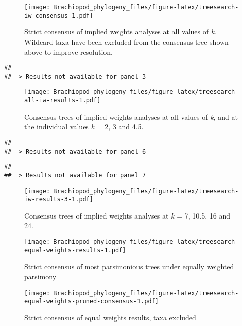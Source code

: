 \documentclass[openany]{book}
\theoremstyle{definition}
\theoremstyle{definition}
\theoremstyle{definition}
\theoremstyle{remark}
\begin{document}
\begin{figure}
\centering
\texttt{[image: Brachiopod\_phylogeny\_files/figure-latex/treesearch-iw-consensus-1.pdf]}
\caption{\label{fig:treesearch-iw-consensus}Strict consensus of implied weights analyses at all
values of \emph{k}. Wildcard taxa have been excluded from the consensus
tree shown above to improve resolution.}
\end{figure}








\clearpage 

\begin{verbatim}
## 
##  > Results not available for panel 3
\end{verbatim}

\begin{figure}
\centering
\texttt{[image: Brachiopod\_phylogeny\_files/figure-latex/treesearch-all-iw-results-1.pdf]}
\caption{\label{fig:treesearch-all-iw-results}Consensus trees of implied weights analyses
at all values of \emph{k}, and at the individual
values \emph{k} = 2, 3 and 4.5.}
\end{figure}

\clearpage 

\begin{verbatim}
## 
##  > Results not available for panel 6
\end{verbatim}

\begin{verbatim}
## 
##  > Results not available for panel 7
\end{verbatim}

\begin{figure}
\centering
\texttt{[image: Brachiopod\_phylogeny\_files/figure-latex/treesearch-iw-results-3-1.pdf]}
\caption{\label{fig:treesearch-iw-results-3}Consensus trees of implied weights analyses
at \emph{k} = 7, 10.5, 16 and 24.}
\end{figure}

\clearpage

\begin{figure}
\centering
\texttt{[image: Brachiopod\_phylogeny\_files/figure-latex/treesearch-equal-weights-results-1.pdf]}
\caption{\label{fig:treesearch-equal-weights-results}Strict consensus of
most parsimonious trees under equally weighted parsimony}
\end{figure}

\begin{figure}
\centering
\texttt{[image: Brachiopod\_phylogeny\_files/figure-latex/treesearch-equal-weights-pruned-consensus-1.pdf]}
\caption{\label{fig:treesearch-equal-weights-pruned-consensus}Strict
consensus of equal weights results, taxa excluded}
\end{figure}
\end{document}
